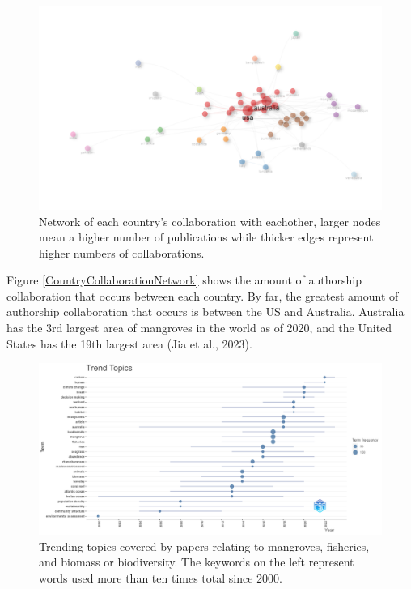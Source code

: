 \documentclass[
  12pt,
]{article}
\begin{document}
\begin{figure}
\includegraphics[width=1\linewidth]{CountryCollaborationNetwork} \caption{Network of each country's collaboration with eachother, larger nodes mean a higher number of publications while thicker edges represent higher numbers of collaborations. \label{CountryCollaborationNetwork}}\label{fig:CountryCollaborationNetwork}
\end{figure}



Figure \ref{CountryCollaborationNetwork} shows the amount of authorship collaboration that occurs between each country. By far, the greatest amount of authorship collaboration that occurs is between the US and Australia. Australia has the 3rd largest area of mangroves in the world as of 2020, and the United States has the 19th largest area (Jia et al., 2023).

\begin{figure}
\includegraphics[width=1\linewidth]{TrendTopics} \caption{Trending topics covered by papers relating to mangroves, fisheries, and biomass or biodiversity. The keywords on the left represent words used more than ten times total since 2000. \label{TrendTopics}}\label{fig:TrendTopics}
\end{figure}
\end{document}
